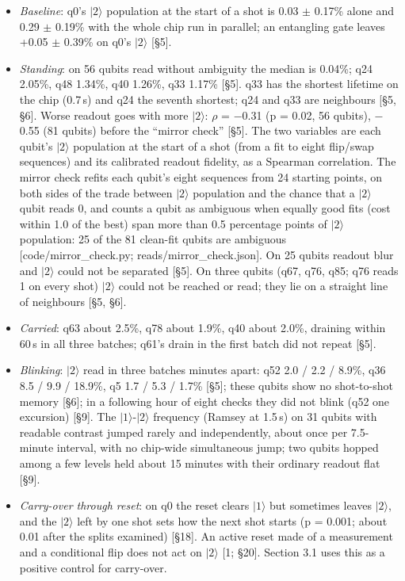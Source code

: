 \documentclass[11pt]{article}
\begin{document}
\begin{itemize}
\item \emph{Baseline}: q0's \(|2\rangle\) population at the start of a shot is 0.03 \(\pm\) 0.17\% alone and 0.29 \(\pm\) 0.19\% with the whole chip run in parallel; an entangling gate leaves +0.05 \(\pm\) 0.39\% on q0's \(|2\rangle\) {[}\S{}5{]}.
\item \emph{Standing}: on 56 qubits read without ambiguity the median is 0.04\%; q24 2.05\%, q48 1.34\%, q40 1.26\%, q33 1.17\% {[}\S{}5{]}. q33 has the shortest lifetime on the chip (0.7\,\textmu s) and q24 the seventh shortest; q24 and q33 are neighbours {[}\S{}5, \S{}6{]}. Worse readout goes with more \(|2\rangle\): \(\rho\) = \(-\)0.31 (p = 0.02, 56 qubits), \(-\)0.55 (81 qubits) before the ``mirror check'' {[}\S{}5{]}. The two variables are each qubit's \(|2\rangle\) population at the start of a shot (from a fit to eight flip/swap sequences) and its calibrated readout fidelity, as a Spearman correlation. The mirror check refits each qubit's eight sequences from 24 starting points, on both sides of the trade between \(|2\rangle\) population and the chance that a \(|2\rangle\) qubit reads 0, and counts a qubit as ambiguous when equally good fits (cost within 1.0 of the best) span more than 0.5 percentage points of \(|2\rangle\) population: 25 of the 81 clean-fit qubits are ambiguous {[}code/mirror\_check.py; reads/mirror\_check.json{]}. On 25 qubits readout blur and \(|2\rangle\) could not be separated {[}\S{}5{]}. On three qubits (q67, q76, q85; q76 reads 1 on every shot) \(|2\rangle\) could not be reached or read; they lie on a straight line of neighbours {[}\S{}5, \S{}6{]}.
\item \emph{Carried}: q63 about 2.5\%, q78 about 1.9\%, q40 about 2.0\%, draining within 60\,\textmu s in all three batches; q61's drain in the first batch did not repeat {[}\S{}5{]}.
\item \emph{Blinking}: \(|2\rangle\) read in three batches minutes apart: q52 2.0 / 2.2 / 8.9\%, q36 8.5 / 9.9 / 18.9\%, q5 1.7 / 5.3 / 1.7\% {[}\S{}5{]}; these qubits show no shot-to-shot memory {[}\S{}6{]}; in a following hour of eight checks they did not blink (q52 one excursion) {[}\S{}9{]}. The \(|1\rangle\)-\(|2\rangle\) frequency (Ramsey at 1.5\,\textmu s) on 31 qubits with readable contrast jumped rarely and independently, about once per 7.5-minute interval, with no chip-wide simultaneous jump; two qubits hopped among a few levels held about 15 minutes with their ordinary readout flat {[}\S{}9{]}.
\item \emph{Carry-over through reset}: on q0 the reset clears \(|1\rangle\) but sometimes leaves \(|2\rangle\), and the \(|2\rangle\) left by one shot sets how the next shot starts (p = 0.001; about 0.01 after the splits examined) {[}\S{}18{]}. An active reset made of a measurement and a conditional flip does not act on \(|2\rangle\) {[}1; \S{}20{]}. Section 3.1 uses this as a positive control for carry-over.
\end{itemize}
\end{document}
